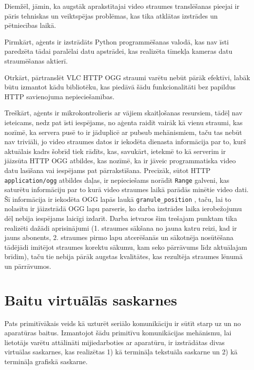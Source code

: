 Diemžēl, jāmin, ka augstāk aprakstītajai video straumes translēšanas pieejai ir
pāris tehniskas un veiktspējas problēmas, kas tika atklātas izstrādes un
pētniecības laikā.

Pirmkārt, aģents ir izstrādāts Python programmēšanas valodā, kas nav īsti
paredzēta tādai paralēlai datu apstrādei, kas realizēta tīmekļa kameras datu
straumēšanas aktierī.

Otrkārt, pārtranslēt VLC HTTP OGG straumi varētu nebūt pārāk efektīvi, labāk
būtu izmantot kādu bibliotēku, kas piedāvā šādu funkcionalitāti bez papildus
HTTP savienojuma nepieciešamības.

Treškārt, aģents ir mikrokontrolieris ar vājiem skaitļošanas resursiem, tādēļ
nav ieteicams, nedz pat īsti iespējams, no aģenta raidīt vairāk kā vienu
straumi, kas nozīmē, ka servera pusē to ir jāduplicē ar \gls{pubsub}
mehānismiem, taču tas nebūt nav triviāli, jo video straumes datos ir iekodēta
dienasta informācija par to, kurš aktuālais kadrs šobrīd tiek rādīts, kas,
savukārt, ietekmē to kā serverim ir jāizsūta HTTP OGG atbildes, kas nozīmē, ka
ir jāveic programmatiska video datu lasīšana vai iespējams pat pārrakstīšana.
Precīzāk, sūtot HTTP \lstinline!application/ogg! atbildes daļas, ir nepieciešams
norādīt \lstinline!Range! galveni, kas saturētu informāciju par to kurā video
straumes laikā parādās minētie video dati. \cite[para. 14.35.2]{RFC2616} Šī
informācija ir iekodēta OGG lapās laukā \lstinline!granule_position! \cite[para
6., A]{RFC3533}, taču, lai to nolasītu ir jāizstrādā OGG lapu parseris, ko darba
izstrādes laika ierobežojumu dēļ nebija iespējams laicīgi izdarīt. Darba
ietvaros šim trešajam punktam tika realizēti dažādi aprisinājumi (1. straumes
sākšana no jauna katru reizi, kad ir jauns abonents, 2. straumes pirmo lapu
atcerēšanās un sākotnēja nosūtēšana tādējādi imitējot straumes korektu sākumu,
kam seko pārrāvums līdz aktuālajam brīdim), taču tie nebija pārāk augstas
kvalitātes, kas rezultēja straumes lēnumā un pārrāvumos. 

\section{Baitu virtuālās saskarnes}
\label{sec:vinbytes}

Pats primitīvākais veids kā uzturēt seriālo komunikāciju ir sūtīt starp uz un no
aparatūras baitus. Izmantojot šādu primitīvu komunikācijas mehānismu, lai
lietotājs varētu attālināti mijiedarboties ar aparatūru, ir izstrādātas divas
virtuālas saskarnes, kas realizētas 1) kā termināļa tekstuāla saskarne un 2) kā
termināļa grafiskā saskarne.

